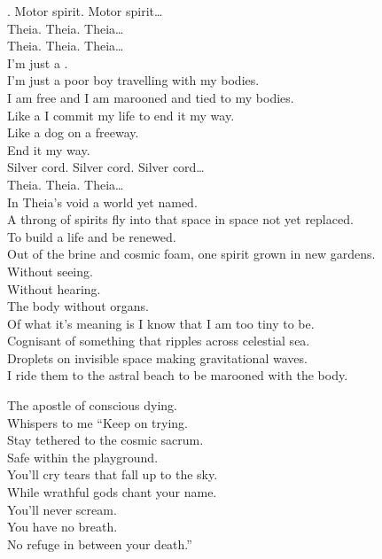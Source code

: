 
. Motor spirit. Motor spirit… \\

Theia. Theia. Theia… \\

Theia. Theia. Theia… \\

I'm just a . \\
I'm just a poor boy travelling with my bodies. \\
I am free and I am marooned and tied to my bodies. \\

Like a  I commit my life to end it my way. \\
Like a dog on a freeway. \\
End it my way. \\

Silver cord. Silver cord. Silver cord… \\

Theia. Theia. Theia… \\

In Theia's void a world yet named. \\
A throng of spirits fly into that space in space not yet replaced. \\
To build a life and be renewed. \\
Out of the brine and cosmic foam, one spirit grown in new gardens. \\
Without seeing. \\
Without hearing. \\
The body without organs. \\

Of what it's meaning is I know that I am too tiny to be. \\
Cognisant of something that ripples across celestial sea. \\
Droplets on invisible space making gravitational waves. \\
I ride them to the astral beach to be marooned with the body. \\



The apostle of conscious dying. \\
Whispers to me ``Keep on trying. \\
Stay tethered to the cosmic sacrum. \\
Safe within the  playground. \\
You'll cry tears that fall up to the sky. \\
While wrathful gods chant your name. \\
You'll never scream. \\
You have no breath. \\
No refuge in between your death.'' \\

